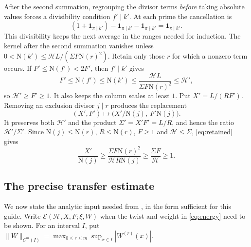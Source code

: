 \documentclass[11pt]{article}
\newcommand{\N}{\mathrm N}
\newcommand{\E}{\mathcal E}
\newcommand{\ind}{\mathbf 1}
\numberwithin{equation}{section}
\begin{document}
After the second summation, regrouping the divisor terms \emph{before}
taking absolute values forces a divisibility condition $f'\mid k'$.
At each prime the cancellation is
\begin{equation}\label{eq:localcancel}
 (1+\ind_{\pi\mid k'})-\ind_{\pi\mid k'}
                         -\ind_{\pi\nmid k'}=\ind_{\pi\mid k'}.
\end{equation}
This divisibility keeps the next average in the ranges needed for
induction. The kernel after the second summation vanishes unless
$0<\N(k')\le\mathcal HL/(\Sigma F\N(r)^2)$. Retain only those $r$ for
which a nonzero term occurs. If $F'\le\N(f')<2F'$, then $f'\mid k'$ gives
\begin{equation}\label{eq:retained}
 F'\le\N(f')\le\N(k')\le\frac{\mathcal HL}{\Sigma F\N(r)^2}\le\mathcal H',
\end{equation}
so $\mathcal H'\ge F'\ge1$. It also keeps the column scales at least $1$.
Put $X'=L/(RF')$. Removing an exclusion divisor $j\mid r$ produces the
replacement
\begin{equation}\label{eq:exclusionswap}
 (X',F')\longmapsto\bigl(X'/\N(j),\ F'\N(j)\bigr).
\end{equation}
It preserves both $\mathcal H'$ and the product $\Sigma'=X'F'=L/R$,
and hence the ratio $\mathcal H'/\Sigma'$. Since $\N(j)\le\N(r)$,
$R\le\N(r)$, $F\ge1$ and
$\mathcal H\le\Sigma$, \eqref{eq:retained} gives
\begin{equation}\label{eq:childcolumn}
 \frac{X'}{\N(j)}\ge\frac{\Sigma F\N(r)^2}{\mathcal HR\N(j)}
 \ge\frac{\Sigma F}{\mathcal H}\ge1.
\end{equation}

\subsection{The precise transfer estimate}
We now state the analytic input needed from \cite{original}, in the
form sufficient for this guide. Write $\E(\mathcal H,X,F;\xi,W)$ when
the twist and weight in \eqref{eq:energy} need to be shown. For an interval
$I$, put $\|W\|_{C^m(I)}=\max_{0\le r\le m}\sup_{x\in I}|W^{(r)}(x)|$.
\end{document}
